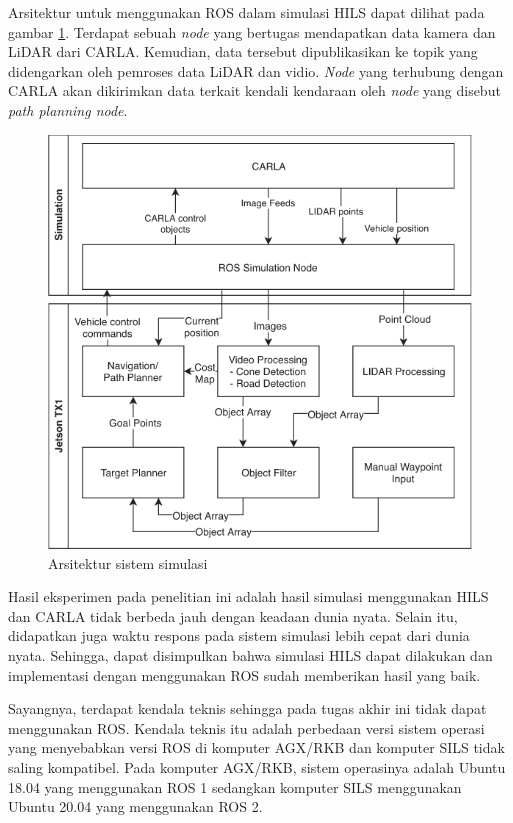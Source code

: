Arsitektur untuk menggunakan ROS dalam simulasi HILS dapat dilihat pada gambar
\ref{chapter-2-carla-jetson-arch}. Terdapat sebuah \textit{node}  yang
bertugas mendapatkan data kamera dan LiDAR dari CARLA. Kemudian, data tersebut
dipublikasikan ke topik yang didengarkan oleh pemroses data LiDAR dan vidio.
\textit{Node} yang terhubung dengan CARLA akan dikirimkan data terkait kendali
kendaraan oleh \textit{node} yang disebut \textit{path planning node}.

\begin{figure}
    \centering
    \includegraphics[width=1.0\textwidth]{resources/chapter-2/carla-jetson-arch.png}
    \caption{Arsitektur sistem simulasi \parencite{brogle_CarlaHILS}}
    \label{chapter-2-carla-jetson-arch}
\end{figure}

Hasil eksperimen pada penelitian ini adalah hasil simulasi menggunakan HILS dan
CARLA tidak berbeda jauh dengan keadaan dunia nyata. Selain itu, didapatkan juga
waktu respons pada sistem simulasi lebih cepat dari dunia nyata. Sehingga, dapat
disimpulkan bahwa simulasi HILS dapat dilakukan dan implementasi dengan
menggunakan ROS sudah memberikan hasil yang baik.

Sayangnya, terdapat kendala teknis sehingga pada tugas akhir ini tidak dapat
menggunakan ROS. Kendala teknis itu adalah perbedaan versi sistem operasi yang
menyebabkan versi ROS di komputer AGX/RKB dan komputer SILS tidak saling
kompatibel. Pada komputer AGX/RKB, sistem operasinya adalah Ubuntu 18.04 yang
menggunakan ROS 1 sedangkan komputer SILS menggunakan Ubuntu 20.04 yang
menggunakan ROS 2.
